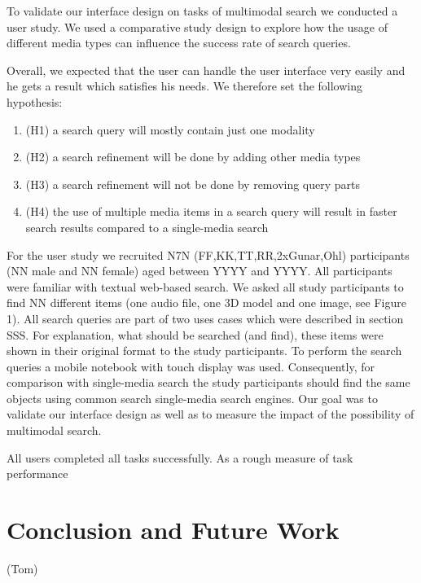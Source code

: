 \documentclass[runningheads,a4paper]{llncs}
\begin{document}
To validate our interface design on tasks of multimodal search we conducted a user study. 
We used a comparative study design to explore how the usage of different media types can 
influence the success rate of search queries. 

Overall, we expected that the user can handle the user interface very easily and he gets a 
result which satisfies his needs. We therefore set the following hypothesis: 
\begin{enumerate}
  \item (H1) a search query will mostly contain just one modality
  \item (H2) a search refinement will be done by adding other media types
  \item (H3) a search refinement will not be done by removing query parts
  \item (H4) the use of multiple media items in a search query will result
  in faster search results compared to a single-media search
\end{enumerate}

For the user study we recruited N7N (FF,KK,TT,RR,2xGunar,Ohl) participants (NN male and NN female) 
aged between YYYY and YYYY. All participants were familiar with textual web-based search. 
We asked all study participants to find NN different items (one audio file, one 3D model and 
one image, see Figure 1). All search queries are part of two uses cases which were described in 
section SSS. For explanation, what should be searched (and find), these items were shown in their 
original format to the study participants. To perform the search queries a mobile notebook with 
touch display was used. Consequently, for comparison with single-media search the study participants 
should find the same objects using common search single-media search engines.
Our goal was to validate our interface design as well as to measure the impact of the possibility of 
multimodal search. 

All users completed all tasks successfully. As a rough measure of task performance

\section{Conclusion and Future Work}
(Tom)



\end{document}
